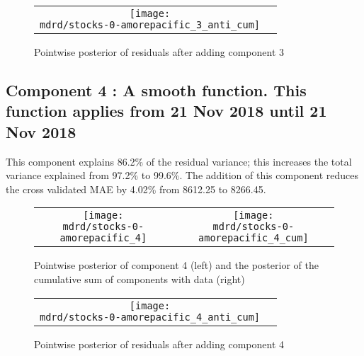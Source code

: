 \documentclass{article} %
\begin{document}
\begin{figure}[H]
\newcommand{\wmgd}{0.5\columnwidth}
\newcommand{\hmgd}{3.0cm}
\newcommand{\mdrd}{stocks-0-amorepacific}
\newcommand{\mbm}{\hspace{-0.3cm}}
\begin{tabular}{cc}
\mbm \texttt{[image: \\mdrd/stocks-0-amorepacific\_3\_anti\_cum]}
\end{tabular}
\caption{Pointwise posterior of residuals after adding component 3}
\label{fig:comp3}
\end{figure}

\subsection{Component 4 : A smooth function. This function applies from 21 Nov 2018 until 21 Nov 2018}



This component explains 86.2\% of the residual variance; this increases the total variance explained from 97.2\% to 99.6\%.
The addition of this component reduces the cross validated MAE by 4.02\% from 8612.25 to 8266.45.


\begin{figure}[H]
\newcommand{\wmgd}{0.5\columnwidth}
\newcommand{\hmgd}{3.0cm}
\newcommand{\mdrd}{stocks-0-amorepacific}
\newcommand{\mbm}{\hspace{-0.3cm}}
\begin{tabular}{cc}
\mbm \texttt{[image: \\mdrd/stocks-0-amorepacific\_4]} & \texttt{[image: \\mdrd/stocks-0-amorepacific\_4\_cum]}
\end{tabular}
\caption{Pointwise posterior of component 4 (left) and the posterior of the cumulative sum of components with data (right)}
\label{fig:comp4}
\end{figure}

\begin{figure}[H]
\newcommand{\wmgd}{0.5\columnwidth}
\newcommand{\hmgd}{3.0cm}
\newcommand{\mdrd}{stocks-0-amorepacific}
\newcommand{\mbm}{\hspace{-0.3cm}}
\begin{tabular}{cc}
\mbm \texttt{[image: \\mdrd/stocks-0-amorepacific\_4\_anti\_cum]}
\end{tabular}
\caption{Pointwise posterior of residuals after adding component 4}
\label{fig:comp4}
\end{figure}
\end{document}
